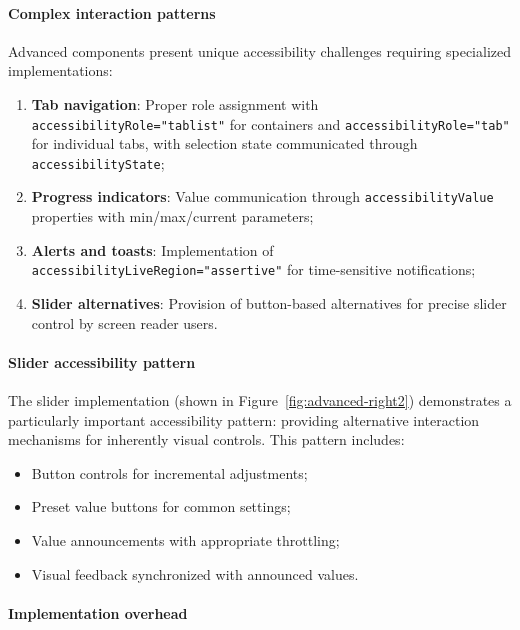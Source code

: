 \paragraph{Complex interaction patterns}

Advanced components present unique accessibility challenges requiring specialized implementations:

\begin{enumerate}
    \item \textbf{Tab navigation}: Proper role assignment with \texttt{accessibilityRole="tablist"} for containers and \texttt{accessibilityRole="tab"} for individual tabs, with selection state communicated through \texttt{accessibilityState};
    
    \item \textbf{Progress indicators}: Value communication through \texttt{accessibilityValue} properties with min/max/current parameters;
    
    \item \textbf{Alerts and toasts}: Implementation of \texttt{accessibilityLiveRegion="assertive"} for time-sensitive notifications;
    
    \item \textbf{Slider alternatives}: Provision of button-based alternatives for precise slider control by screen reader users.
\end{enumerate}

\paragraph{Slider accessibility pattern}

The slider implementation (shown in Figure~\ref{fig:advanced-right2}) demonstrates a particularly important accessibility pattern: providing alternative interaction mechanisms for inherently visual controls. This pattern includes:

\begin{itemize}
    \item Button controls for incremental adjustments;
    \item Preset value buttons for common settings;
    \item Value announcements with appropriate throttling;
    \item Visual feedback synchronized with announced values.
\end{itemize}

\paragraph{Implementation overhead}

